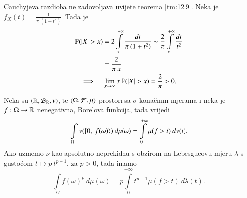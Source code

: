 \begin{pr}  \label{pr:12.11}
    Cauchyjeva razdioba ne zadovoljava uvijete teorema \ref{tm:12.9}.
    Neka je $f_X (t) = \frac{1}{\pi \: (1 + t^2)}$.
    Tada je
    \begin{equation*}
        \begin{gathered}
            \begin{aligned}
                \mathbb{P}({|X| > x}) &= 2 \int\limits_x^{+\infty} \frac{dt}{\pi \: (1 + t^2)} \sim \frac{2}{\pi} \int\limits_x^{+\infty} \frac{dt}{t^2}\\
                &= \frac{2}{\pi \: x}
            \end{aligned}\\
            \implies \quad \lim\limits_{x \to \infty} x \: \mathbb{P}({|X| > x}) = \frac{2}{\pi} > 0.
        \end{gathered}
    \end{equation*}
\end{pr}

\begin{tm}  \label{tm:12.11-1}
    Neka su $(\mathbb{R}, \mathcal{B}_{\mathbb{R}}, \nu)$, te $ (\Omega, \mathcal{F}, \mu) $ prostori sa $\sigma$-kona\v cnim mjerama i neka je $f : \Omega \to \mathbb{R}$ nenegativna, Borelova funkcija, tada vrijedi
    \begin{equation*}
        \int\limits_\Omega \nu ([ {0}, \: {f(\omega)} \rangle) \: d \mu (\omega) = \int\limits_{0}^{+\infty} \mu (f>t) \: d \nu (t).
    \end{equation*}
    Ako uzmemo $\nu$ kao apsolutno neprekidnu s obzirom na Lebesgueovu mjeru $\lambda$ s gusto\' com $t \mapsto p \: t^{p-1}$, za $p>0$, tada imamo
    \begin{equation*}
        \int\limits_\Omega f(\omega)^p \: d \mu (\omega) = p \int\limits_{0}^{+\infty} t^{p-1} \mu (f > t) \: d \lambda (t).
    \end{equation*}
\end{tm}

